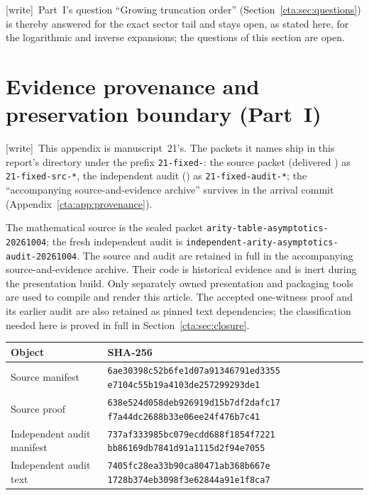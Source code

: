 \documentclass[11pt]{article}
\theoremstyle{definition}
\theoremstyle{remark}
\newcommand{\wtag}{\textup{[write]}}
\begin{document}
\wtag\ Part~I's question ``Growing truncation order''
(Section~\ref{cta:sec:questions}) is thereby answered for the exact sector
tail and stays open, as stated here, for the logarithmic and inverse
expansions; the questions of this section are open.

\appendix
\section{Evidence provenance and preservation boundary (Part~I)}\label{cta:sec:provenance}

\wtag\ This appendix is manuscript~21's. The packets it names ship in this
report's directory under the prefix \texttt{21-fixed-}: the source packet
(delivered ) as \texttt{21-fixed-src-*}, the
independent audit () as
\texttt{21-fixed-audit-*}; the ``accompanying source-and-evidence archive''
survives in the arrival commit (Appendix~\ref{cta:app:provenance}).

The mathematical source is the sealed packet
\texttt{arity-table-asymptotics-20261004}; the fresh independent audit is
\texttt{independent-arity-asymptotics-audit-20261004}. The source and audit
are retained in full in the accompanying source-and-evidence archive.
Their code is historical evidence and is inert during the presentation
build. Only separately owned presentation and packaging tools are used
to compile and render this article. The accepted one-witness proof and
its earlier audit are also retained as pinned text dependencies; the
classification needed here is proved in full in Section~\ref{cta:sec:closure}.

\begin{center}
\small
\begin{tabular}{@{}p{}p{}@{}}
\toprule
Object & SHA-256\\
\midrule
Source manifest & \texttt{6ae30398c52b6fe1d07a91346791ed3355}\newline
\texttt{e7104c55b19a4103de257299293de1}\\[3pt]
Source proof & \texttt{638e524d058deb926919d15b7df2dafc17}\newline
\texttt{f7a44dc2688b33e06ee24f476b7c41}\\[3pt]
Independent audit manifest & \texttt{737af333985bc079ecdd688f1854f7221}\newline
\texttt{bb86169db7841d91a1115d2f94e7055}\\[3pt]
Independent audit text & \texttt{7405fc28ea33b90ca80471ab368b667e}\newline
\texttt{1728b374eb3098f3e62844a91e1f8ca7}\\
\bottomrule
\end{tabular}
\end{center}
\end{document}
